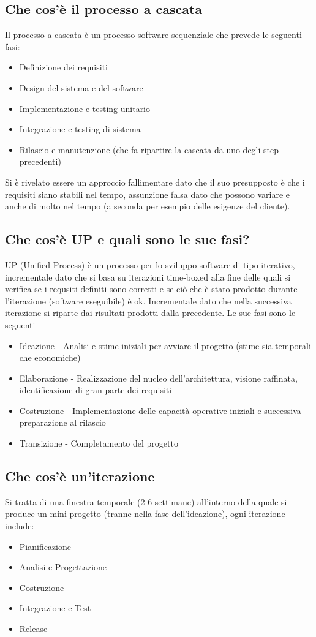 \documentclass[12pt, a4paper, openany]{book}
\begin{document}
\subsection*{Che cos'è il processo a cascata}
Il processo a cascata è un processo software sequenziale che prevede le seguenti fasi:
\begin{itemize}
    \item Definizione dei requisiti
    \item Design del sistema e del software
    \item Implementazione e testing unitario
    \item Integrazione e testing di sistema
    \item Rilascio e manutenzione (che fa ripartire la cascata da uno degli step precedenti)
\end{itemize}
Si è rivelato essere un approccio fallimentare dato che il suo presupposto è che i requisiti
siano stabili nel tempo, assunzione falsa dato che possono variare e anche di molto nel tempo (a
seconda per esempio delle esigenze del cliente).

\subsection*{Che cos'è UP e quali sono le sue fasi?}
UP (Unified Process) è un processo per lo sviluppo software di tipo iterativo, incrementale
dato che si basa su iterazioni time-boxed alla fine delle quali si verifica se i requsiti definiti sono corretti
e se ciò che è stato prodotto durante l'iterazione (software eseguibile) è ok. Incrementale dato che
nella successiva iterazione si riparte dai risultati prodotti dalla precedente. Le sue fasi sono le seguenti
\begin{itemize}
    \item Ideazione - Analisi e stime iniziali per avviare il progetto (stime sia temporali che economiche)
    \item Elaborazione - Realizzazione del nucleo dell'architettura, visione raffinata, identificazione di gran parte
    dei requisiti
    \item Costruzione - Implementazione delle capacità operative iniziali e successiva preparazione al rilascio
    \item Transizione - Completamento del progetto
\end{itemize}

\subsection*{Che cos'è un'iterazione}
Si tratta di una finestra temporale (2-6 settimane) all'interno della quale si produce
un mini progetto (tranne nella fase dell'ideazione), ogni iterazione include:
\begin{itemize}
    \item Pianificazione
    \item Analisi e Progettazione
    \item Costruzione
    \item Integrazione e Test
    \item Release
\end{itemize}
\end{document}
